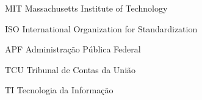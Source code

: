 \begin{siglas}
  \item[MIT] Massachusetts Institute of Technology 
 \item[ISO] International Organization for Standardization
 \item[APF] Administração Pública Federal
 \item[TCU] Tribunal de Contas da União
 \item[TI] Tecnologia da Informação
\end{siglas}

